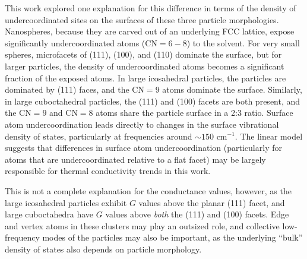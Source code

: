 This work explored one explanation for this difference in terms of the
density of undercoordinated sites on the surfaces of these three
particle morphologies. Nanospheres, because they are carved out of an
underlying FCC lattice, expose significantly undercoordinated atoms
($\text{CN} = 6-8$) to the solvent. For very small spheres,
microfacets of (111), (100), and (110) dominate the surface, but for
larger particles, the density of undercoordinated atoms becomes a
significant fraction of the exposed atoms.  In large icosahedral
particles, the particles are dominated by (111) faces, and the
$\text{CN} = 9$ atoms dominate the surface.  Similarly, in large
cuboctahedral particles, the (111) and (100) facets are both present,
and the $\text{CN} = 9$ and $\text{CN} = 8$ atoms share the particle
surface in a 2:3 ratio. Surface atom undercoordination leads directly
to changes in the surface vibrational density of states, particularly
at frequencies around $\sim 150 \text{~cm}^{-1}$.  The linear model
suggests that differences in surface atom undercoordination
(particularly for atoms that are undercoordinated relative to a flat
facet) may be largely responsible for thermal conductivity trends in this work.

This is not a complete explanation for the conductance values,
however, as the large icosahedral particles exhibit $G$ values above
the planar (111) facet, and large cuboctahedra have $G$ values above
\textit{both} the (111) and (100) facets.  Edge and vertex atoms in
these clusters may play an outsized role, and collective low-frequency
modes of the particles may also be important, as the underlying
``bulk'' density of states also depends on particle morphology.



%


%

%

